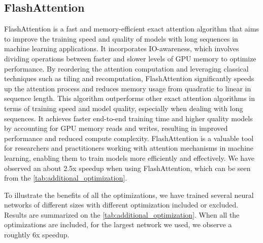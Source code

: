 \subsection{FlashAttention}

FlashAttention is a fast and memory-efficient exact attention algorithm that aims to improve the training speed and
quality of models with long sequences in machine learning applications. It incorporates IO-awareness, which involves
dividing operations between faster and slower levels of GPU memory to optimize performance. By reordering the attention
computation and leveraging classical techniques such as tiling and recomputation, FlashAttention significantly speeds up
the attention process and reduces memory usage from quadratic to linear in sequence length. This algorithm outperforms
other exact attention algorithms in terms of training speed and model quality, especially when dealing with long
sequences. It achieves faster end-to-end training time and higher quality models by accounting for GPU memory reads and
writes, resulting in improved performance and reduced compute complexity. FlashAttention is a valuable tool for
researchers and practitioners working with attention mechanisms in machine learning, enabling them to train models more
efficiently and effectively. We have observed an about 2.5x speedup when using FlashAttention, which can be seen from
the \autoref{tab:additional_optimization}.

To illustrate the benefits of all the optimizations, we have trained several neural networks of different sizes with
different optimization included or excluded.  Results are summarized on the \autoref{tab:additional_optimization}. When
all the optimizations are included, for the largest network we used, we observe a roughtly 6x speedup.


